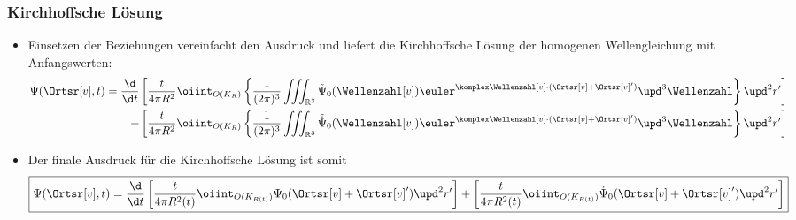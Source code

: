  \begin{frame}
  \frametitle{Kirchhoffsche Lösung}
  \begin{itemize}[<+->]
  \item Einsetzen der Beziehungen vereinfacht den Ausdruck und liefert die \alert{Kirchhoffsche Lösung} der homogenen Wellengleichung mit Anfangswerten:
    \begin{align*}
      \Psi(\Ortsr[v], t) = \frac{\d}{\d t} &\left[ \frac{t}{4\pi R^2} \oiint_{O(K_R)} \left\{ \frac{1}{(2\pi)^3}\iiint_{\mathbb{R}^3}  \tilde{\Psi}_0(\Wellenzahl[v]) \euler^{\komplex\Wellenzahl[v] \cdot (\Ortsr[v]+\Ortsr[v]')} \upd^3\Wellenzahl\right\} \upd^2 r' \right] \\
      + &\left[ \frac{t}{4\pi R^2} \oiint_{O(K_R)} \left\{ \frac{1}{(2\pi)^3}\iiint_{\mathbb{R}^3}  \tilde{\dot{\Psi}}_0(\Wellenzahl[v]) \euler^{\komplex\Wellenzahl[v] \cdot (\Ortsr[v]+\Ortsr[v]')} \upd^3\Wellenzahl\right\} \upd^2 r' \right]
    \end{align*}
  \item Der finale Ausdruck für die \alert{Kirchhoffsche Lösung} ist somit
    \begin{equation*}
      \boxed{\Psi(\Ortsr[v], t) = \frac{\d}{\d t} \left[ \frac{t}{4\pi R^2(t)} \oiint_{O(K_{R(t)})} \Psi_0(\Ortsr[v]+\Ortsr[v]') \upd^2 r' \right] 
      + \left[ \frac{t}{4\pi R^2(t)} \oiint_{O(K_{R(t)})} \dot{\Psi}_0(\Ortsr[v]+\Ortsr[v]') \upd^2 r' \right]}
    \end{equation*}
    \end{itemize}
  \end{frame}

